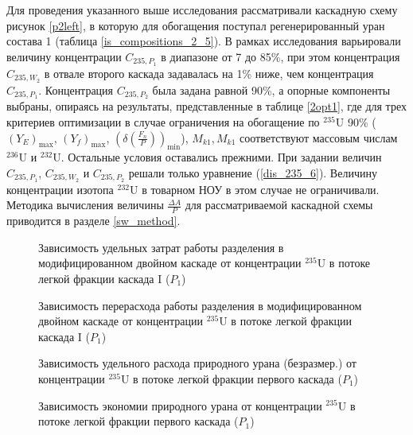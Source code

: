 Для проведения указанного выше исследования рассматривали каскадную схему рисунок \ref{p2left}, в которую для обогащения поступал регенерированный уран состава 1 (таблица \ref{is_compositions_2_5}). В рамках исследования варьировали величину концентрации $C_{235,{P_1}}$ в диапазоне от 7 до 85\%, при этом концентрация $C_{235,{W_2}}$ в отвале второго каскада задавалась на 1\% ниже, чем концентрация $C_{235,{P_1}}$. Концентрация $C_{235,{P_2}}$ была задана равной 90\%, а опорные компоненты выбраны, опираясь на результаты, представленные в таблице \ref{2opt1}, где для трех критериев оптимизации в случае ограничения на обогащение по $^{235}$U 90\% ($(Y_{E})_\text{max}$, $(Y_f)_\text{max}$, $(\delta(\frac{F_n}{P}))_\text{min}$), $M_{k1}, M_{k1}$ соответствуют массовым числам $^{236}$U и $^{232}$U. Остальные условия оставались прежними. При задании величин $C_{235,{P_1}}$, $C_{235,{W_2}}$ и $C_{235,{P_2}}$  решали только уравнение (\ref{dis_235_6}). Величину концентрации изотопа $^{232}$U в товарном НОУ в этом случае не ограничивали.
Методика вычисления величины $\frac{\Delta A}{P}$ для рассматриваемой каскадной схемы приводится в разделе \ref{sw_method}.
\begin{figure}[ht]
    \centering
    \begin{minipage}{.5\textwidth}
        \centering
        
  \caption{{Зависимость удельных затрат работы разделения в модифицированном двойном каскаде  от концентрации $^{235}$U в потоке легкой фракции каскада I ($P_1$){\label{SWP1}}}}
  \end{minipage}%
    \begin{minipage}{.5\textwidth}
      \centering
      
\caption{{Зависимость перерасхода работы разделения в модифицированном двойном каскаде от концентрации $^{235}$U в потоке легкой фракции каскада I ($P_1$){\label{SW_lP1}}}}
    \end{minipage}
\end{figure}

\begin{figure}[ht]
    \centering
    \begin{minipage}{.5\textwidth}
        \centering
        
  \caption{{Зависимость удельного расхода природного урана (безразмер.) от концентрации $^{235}$U в потоке легкой фракции первого каскада ($P_1$){\label{FnuP1}}}}
  \end{minipage}%
    \begin{minipage}{.5\textwidth}
      \centering
      
\caption{{Зависимость экономии природного урана от концентрации $^{235}$U в потоке легкой фракции первого каскада ($P_1$){\label{pFoP1}}}}
    \end{minipage}
\end{figure}


